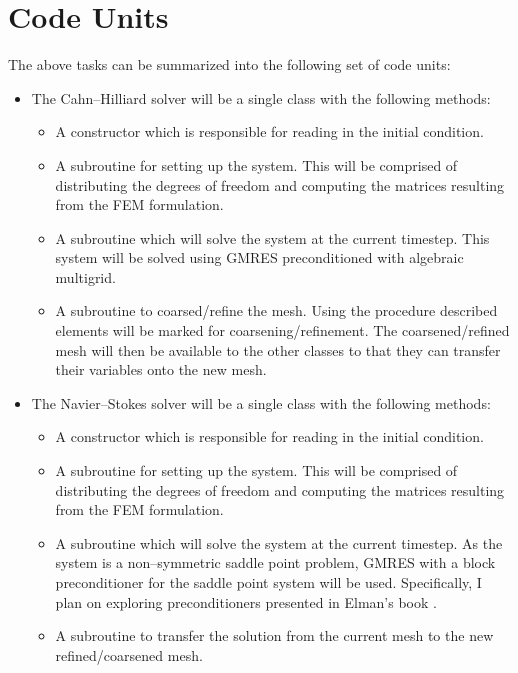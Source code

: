 \documentclass[11pt,fullpage]{article}
\theoremstyle{lemma}
\theoremstyle{definition}
\theoremstyle{lemma}
\begin{document}
\section{Code Units}
The above tasks can be summarized into the following set of code units:
\begin{itemize}
	\item The Cahn--Hilliard solver will be a single class with the following methods:
	\begin{itemize}
		\item A constructor which is responsible for reading in the initial condition.
		\item A subroutine for setting up the system. This will be comprised of distributing the degrees of freedom and computing the matrices resulting from the FEM formulation.
		\item A subroutine which will solve the system at the current timestep. This system will be solved using GMRES preconditioned with algebraic multigrid.
		\item A subroutine to coarsed/refine the mesh. Using the procedure described elements will be marked for coarsening/refinement. The coarsened/refined mesh will then be available to the other classes to that they can transfer their variables onto the new mesh.
	\end{itemize}
	
	\item The Navier--Stokes solver will be a single class with the following methods:
	\begin{itemize}
		\item A constructor which is responsible for reading in the initial condition.
		\item A subroutine for setting up the system. This will be comprised of distributing the degrees of freedom and computing the matrices resulting from the FEM formulation.
		\item A subroutine which will solve the system at the current timestep. As the system is a non--symmetric saddle point problem, GMRES with a block preconditioner for the saddle point system will be used. Specifically, I plan on exploring preconditioners presented in Elman's book \cite{Precond}.
		\item A subroutine to transfer the solution from the current mesh to the new refined/coarsened mesh.
	\end{itemize}
	

\end{itemize}
\end{document}
